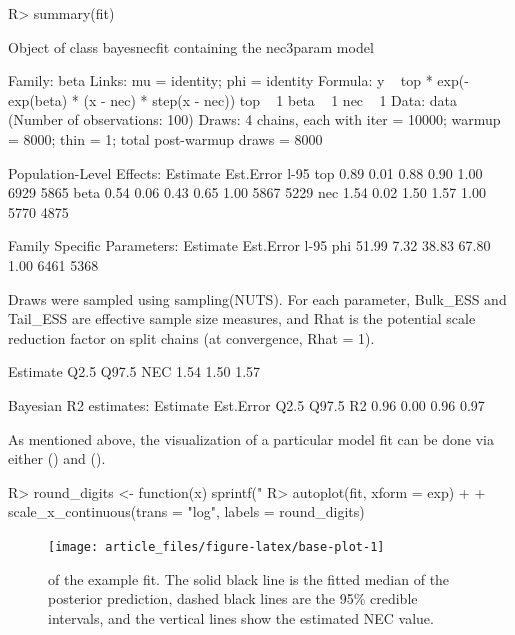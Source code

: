 \documentclass[
  shortnames]{jss}
\begin{document}
\begin{CodeChunk}
\begin{CodeInput}
R> summary(fit)
\end{CodeInput}
\begin{CodeOutput}
Object of class bayesnecfit containing the nec3param model

 Family: beta 
  Links: mu = identity; phi = identity 
Formula: y ~ top * exp(-exp(beta) * (x - nec) * step(x - nec)) 
         top ~ 1
         beta ~ 1
         nec ~ 1
   Data: data (Number of observations: 100) 
  Draws: 4 chains, each with iter = 10000; warmup = 8000; thin = 1;
         total post-warmup draws = 8000

Population-Level Effects: 
     Estimate Est.Error l-95%
top      0.89      0.01     0.88     0.90 1.00     6929     5865
beta     0.54      0.06     0.43     0.65 1.00     5867     5229
nec      1.54      0.02     1.50     1.57 1.00     5770     4875

Family Specific Parameters: 
    Estimate Est.Error l-95%
phi    51.99      7.32    38.83    67.80 1.00     6461     5368

Draws were sampled using sampling(NUTS). For each parameter, Bulk_ESS
and Tail_ESS are effective sample size measures, and Rhat is the potential
scale reduction factor on split chains (at convergence, Rhat = 1).


    Estimate Q2.5 Q97.5
NEC     1.54 1.50  1.57


Bayesian R2 estimates:
   Estimate Est.Error Q2.5 Q97.5
R2     0.96      0.00 0.96  0.97
\end{CodeOutput}
\end{CodeChunk}

As mentioned above, the visualization of a particular model fit can be done via either   () and  \citep{ggplot} ().

\begin{CodeChunk}
\begin{CodeInput}
R> round_digits <- function(x) sprintf("%
R> autoplot(fit, xform = exp) +
+   scale_x_continuous(trans = "log", labels = round_digits)
\end{CodeInput}
\end{CodeChunk}

\begin{CodeChunk}
\begin{figure}[!ht]

{\centering \texttt{[image: article\_files/figure-latex/base-plot-1]} 

}

\caption[  of the example fit]{  of the example fit. The solid black line is the fitted median of the posterior prediction, dashed black lines are the 95\% credible intervals, and the vertical lines show the estimated NEC value.}\label{fig:base-plot}
\end{figure}
\end{CodeChunk}
\end{document}
